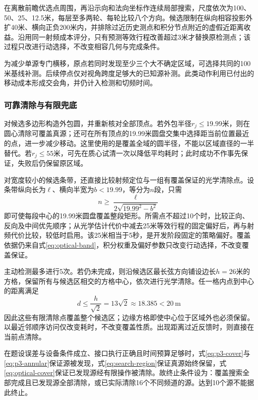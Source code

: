 在离散前瞻优选点周围，再沿示向和法向坐标作连续局部搜索，尺度依次为100、50、25、12.5米，每层至多两轮、每轮比较八个方向。候选限制在纵向相容投影外扩40米、横向正负200米内，并排除过近历史测点和积分节点附近的虚假近距离收益。沿用同一射频成本评分，只有预测等效行程改善超过3米才替换原检测点；该过程只改进行动选择，不改变相容几何与完成条件。

为减少单源专门横移，原点若同时发现至少三个大不确定区域，可选择共同的100米基线补测。后续停点仅对视角跨度足够大的已知源补测。此类动作利用已付出的移动成本形成交会角，并仍计入检测和切频时间。

\subsubsection{可靠清除与有限兜底}
对候选多边形构造外包圆，并重新核对全部顶点。若外包半径$r_j\le19.99$米，则在圆心清除可覆盖真源；还可在所有顶点的19.99米圆盘交集中选择距当前位置最近的点，进一步减少移动。这里使用的是覆盖全域的圆半径，不能以区域直径的一半替代。若$r_j\le55$米，可先在质心试清一次以降低平均耗时；此时成功不作事先保证，失败后仍保留原区域。

对宽度较小的候选条带，还直接比较射频定位与一组有覆盖保证的光学清除点。设条带纵向长为$\ell$、横向半宽为$b<19.99$，等分为$n$段，只需
\begin{equation}
 n\ge\frac{\ell}{2\sqrt{19.99^2-b^2}}
 \label{eq:optical-band}
\end{equation}
即可使每段中心的19.99米圆盘覆盖整段矩形。所需点不超过10个时，比较正向、反向及中间优先顺序；从光学估计代价中减去25米等效行程的固定偏好后，再与射频代价比较，较低时启用。该25米相当于5秒，是开发阶段固定的策略偏好。覆盖依据仍来自式\eqref{eq:optical-band}，积分权重及偏好参数只改变行动选择，不改变覆盖保证。

主动检测最多进行5次。若仍未完成，则沿候选区最长弦方向铺设边长$h=26$米的方格，保留所有与候选区相交的方格中心，依次进行光学清除。任一格内点到中心的距离满足
\begin{equation}
 d\le\frac{h}{\sqrt2}=13\sqrt2\approx18.385<20\ \mathrm{m}
 \label{eq:optical-cover}
\end{equation}
因此这些有限清除点覆盖整个候选区；边缘方格即使中心位于区域外也必须保留。以最近邻顺序访问仅改变耗时，不改变覆盖性质。出现距离过近反馈时，则直接在当前点清除。

在题设误差与设备条件成立、接口执行正确且时间预算足够时，式\eqref{eq:p3-cover}与\eqref{eq:p3-annular}保证源被发现，式\eqref{eq:search-region}保证真源始终保留，式\eqref{eq:optical-cover}保证已发现源经有限操作被清除。故终止条件设为：覆盖搜索全部完成且已发现源全部清除，或已实际清除16个不同频道的源。达到10个源不能据此终止。

